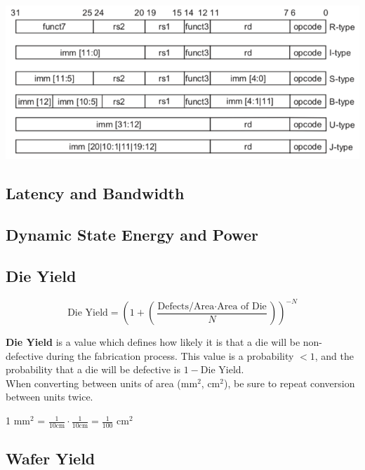 \documentclass[11pt]{article}
\begin{document}
\begin{center}
    \includegraphics[scale=0.5]{riscv_formats}
\end{center}

\subsection{Latency and Bandwidth}

\subsection{Dynamic State Energy and Power}

\subsection{Die Yield}

\begin{center}
    \begin{equation}
    \text{Die Yield} = (1 + (\frac{\text{Defects/Area} \cdot \text{Area of Die}}{N}))^{-N}
    \end{equation}
\end{center}

\textbf{Die Yield} is a value which defines how likely it is that a die will be non-defective during the fabrication process. This value is a probability $< 1$, and the probability that a die will be defective is $1 - $Die Yield. \\
When converting between units of area (mm$^2$, cm$^2$), be sure to repeat conversion between units twice.

\begin{center}
    1 mm$^2$ = $\frac{1}{10 \text{cm}} \cdot \frac{1}{10 \text{cm}} = \frac{1}{100}$ cm$^2$
\end{center}

\subsection{Wafer Yield}
\end{document}
